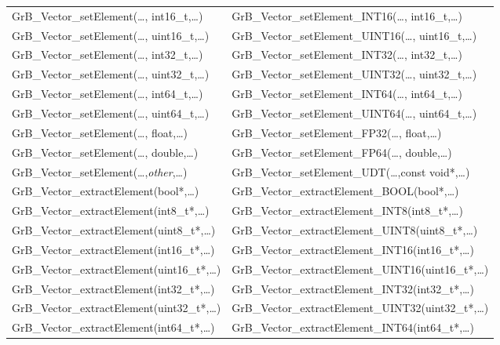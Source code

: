 \begin{table}[htb]
{\begin{tabular}{l|l}
{\sf GrB\_Vector\_setElement(\ldots, int16\_t,\ldots)}		& {\sf GrB\_Vector\_setElement\_INT16(\ldots, int16\_t,\ldots)} \\
{\sf GrB\_Vector\_setElement(\ldots, uint16\_t,\ldots)}		& {\sf GrB\_Vector\_setElement\_UINT16(\ldots, uint16\_t,\ldots)} \\
{\sf GrB\_Vector\_setElement(\ldots, int32\_t,\ldots)}		& {\sf GrB\_Vector\_setElement\_INT32(\ldots, int32\_t,\ldots)} \\
{\sf GrB\_Vector\_setElement(\ldots, uint32\_t,\ldots)}		& {\sf GrB\_Vector\_setElement\_UINT32(\ldots, uint32\_t,\ldots)} \\
{\sf GrB\_Vector\_setElement(\ldots, int64\_t,\ldots)}		& {\sf GrB\_Vector\_setElement\_INT64(\ldots, int64\_t,\ldots)} \\
{\sf GrB\_Vector\_setElement(\ldots, uint64\_t,\ldots)}		& {\sf GrB\_Vector\_setElement\_UINT64(\ldots, uint64\_t,\ldots)} \\
{\sf GrB\_Vector\_setElement(\ldots, float,\ldots)}		& {\sf GrB\_Vector\_setElement\_FP32(\ldots, float,\ldots)} \\
{\sf GrB\_Vector\_setElement(\ldots, double,\ldots)}		& {\sf GrB\_Vector\_setElement\_FP64(\ldots, double,\ldots)} \\
{\sf GrB\_Vector\_setElement(\ldots,\emph{other},\ldots)}	& {\sf GrB\_Vector\_setElement\_UDT(\ldots,const void*,\ldots)} \\ \hline
{\sf GrB\_Vector\_extractElement(bool*,\ldots)}			& {\sf GrB\_Vector\_extractElement\_BOOL(bool*,\ldots)} \\
{\sf GrB\_Vector\_extractElement(int8\_t*,\ldots)}		& {\sf GrB\_Vector\_extractElement\_INT8(int8\_t*,\ldots)} \\
{\sf GrB\_Vector\_extractElement(uint8\_t*,\ldots)}		& {\sf GrB\_Vector\_extractElement\_UINT8(uint8\_t*,\ldots)} \\
{\sf GrB\_Vector\_extractElement(int16\_t*,\ldots)}		& {\sf GrB\_Vector\_extractElement\_INT16(int16\_t*,\ldots)} \\
{\sf GrB\_Vector\_extractElement(uint16\_t*,\ldots)}		& {\sf GrB\_Vector\_extractElement\_UINT16(uint16\_t*,\ldots)} \\
{\sf GrB\_Vector\_extractElement(int32\_t*,\ldots)}		& {\sf GrB\_Vector\_extractElement\_INT32(int32\_t*,\ldots)} \\
{\sf GrB\_Vector\_extractElement(uint32\_t*,\ldots)}		& {\sf GrB\_Vector\_extractElement\_UINT32(uint32\_t*,\ldots)} \\
{\sf GrB\_Vector\_extractElement(int64\_t*,\ldots)}		& {\sf GrB\_Vector\_extractElement\_INT64(int64\_t*,\ldots)} \\

\end{tabular}}
\end{table}

